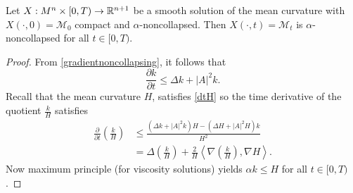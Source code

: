 \begin{corollary}
    [Noncollapsing]
    Let $ X: M^{n} \times [0,T) \to \mathbb{R}^{n+1} $ be a smooth solution of the mean curvature with $ X(\cdot, 0) = \mathcal{M}_{0} $ compact and $ \alpha $-noncollapsed. Then $ X(\cdot,t) = \mathcal{M}_{t} $ is $ \alpha $-noncollapsed for all $t \in [0,T)  $. 
\end{corollary}
\begin{proof}
    From \cref{gradientnoncollapsing}, it follows that 
    \[ \frac{\partial k}{ \partial t} \le \Delta k + |A|^{2}k.\]
    Recall that the mean curvature $ H $, satisfies \cref{dtH} so the time derivative of the quotient $ \frac{k}{H} $ satisfies \begin{align*}
        \frac{\partial }{\partial t}\left( \frac{k}{H} \right)  & \le \frac{(\Delta k+|A|^{2}k)H - (\Delta H + |A|^{2}H)k}{H^{2}} \\
        & = \Delta \left( \frac{k}{H} \right) + \frac{2}{H}\left< \nabla \left( \frac{k}{H} \right), \nabla H \right>.
    \end{align*}
    Now maximum principle (for viscosity solutions) yields $ \alpha k \le H  $ for all $ t \in [0, T) $. 
  

    
\end{proof}